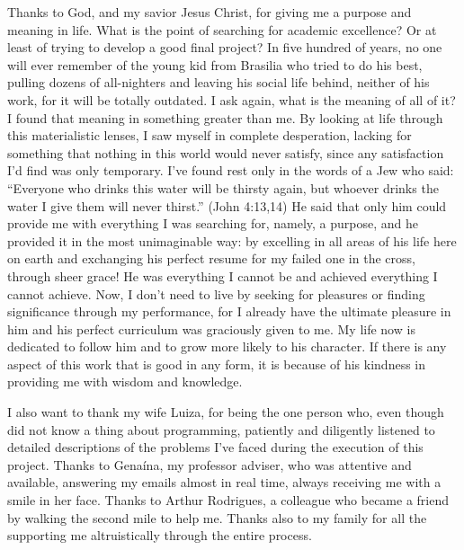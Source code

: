 Thanks to God, and my savior Jesus Christ, for giving me a purpose and meaning in life. What is the point of searching for academic excellence? Or at least of trying to develop a good final project? In five hundred of years, no one will ever remember of the young kid from Brasilia who tried to do his best, pulling dozens of all-nighters and leaving his social life behind, neither of his work, for it will be totally outdated. I ask again, what is the meaning of all of it? I found that meaning in something greater than me. By looking at life through this materialistic lenses, I saw myself in complete desperation, lacking for something that nothing in this world would never satisfy, since any satisfaction I'd find was only temporary. I've found rest only in the words of a Jew who said: “Everyone who drinks this water will be thirsty again, but whoever drinks the water I give them will never thirst.” (John 4:13,14) He said that only him could provide me with everything I was searching for, namely, a purpose, and he provided it in the most unimaginable way: by excelling in all areas of his life here on earth and exchanging his perfect resume for my failed one in the cross, through sheer grace! He was everything I cannot be and achieved everything I cannot achieve. Now, I don't need to live by seeking for pleasures or finding significance through my performance, for I already have the ultimate pleasure in him and his perfect curriculum was graciously given to me. My life now is dedicated to follow him and to grow more likely to his character. If there is any aspect of this work that is good in any form, it is because of his kindness in providing me with wisdom and knowledge.
    
I also want to thank my wife Luiza, for being the one person who, even though did not know a thing about programming, patiently and diligently listened to detailed descriptions of the problems I've faced during the execution of this project. Thanks to Genaína, my professor adviser, who was attentive and available, answering my emails almost in real time, always receiving me with a smile in her face. Thanks to Arthur Rodrigues, a colleague who became a friend by walking the second mile to help me. Thanks also to my family for all the supporting me altruistically through the entire process.